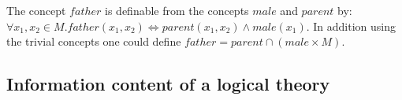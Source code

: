 \begin{exmp}
The concept $father$ is definable from the concepts $male$ and $parent$ by:
$\forall x_1, x_2 \in M. father(x_1, x_2) \iff parent(x_1, x_2) \land male(x_1)$. In addition using the trivial concepts one could define
$father=parent \cap (male \times M)$.
\end{exmp}

\subsection{Information content of a logical theory}
